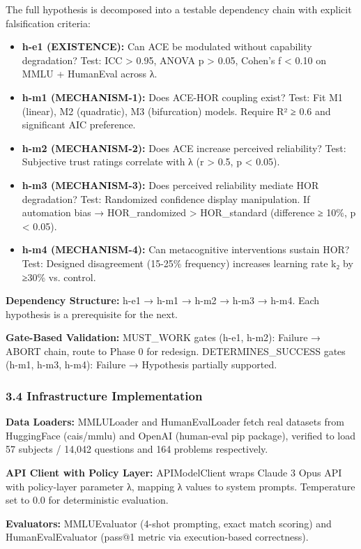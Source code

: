 The full hypothesis is decomposed into a testable dependency chain with explicit falsification criteria:

\begin{itemize}
\item \textbf{h-e1 (EXISTENCE):} Can ACE be modulated without capability degradation? Test: ICC > 0.95, ANOVA p > 0.05, Cohen's f < 0.10 on MMLU + HumanEval across λ.
\item \textbf{h-m1 (MECHANISM-1):} Does ACE-HOR coupling exist? Test: Fit M1 (linear), M2 (quadratic), M3 (bifurcation) models. Require R² ≥ 0.6 and significant AIC preference.
\item \textbf{h-m2 (MECHANISM-2):} Does ACE increase perceived reliability? Test: Subjective trust ratings correlate with λ (r > 0.5, p < 0.05).
\item \textbf{h-m3 (MECHANISM-3):} Does perceived reliability mediate HOR degradation? Test: Randomized confidence display manipulation. If automation bias → HOR_randomized > HOR_standard (difference ≥ 10\%, p < 0.05).
\item \textbf{h-m4 (MECHANISM-4):} Can metacognitive interventions sustain HOR? Test: Designed disagreement (15-25\% frequency) increases learning rate k₂ by ≥30\% vs. control.
\end{itemize}

\textbf{Dependency Structure:} h-e1 → h-m1 → h-m2 → h-m3 → h-m4. Each hypothesis is a prerequisite for the next.

\textbf{Gate-Based Validation:} MUST_WORK gates (h-e1, h-m2): Failure → ABORT chain, route to Phase 0 for redesign. DETERMINES_SUCCESS gates (h-m1, h-m3, h-m4): Failure → Hypothesis partially supported.

\subsubsection{3.4 Infrastructure Implementation}

\textbf{Data Loaders:} MMLULoader and HumanEvalLoader fetch real datasets from HuggingFace (cais/mmlu) and OpenAI (human-eval pip package), verified to load 57 subjects / 14,042 questions and 164 problems respectively.

\textbf{API Client with Policy Layer:} APIModelClient wraps Claude 3 Opus API with policy-layer parameter λ, mapping λ values to system prompts. Temperature set to 0.0 for deterministic evaluation.

\textbf{Evaluators:} MMLUEvaluator (4-shot prompting, exact match scoring) and HumanEvalEvaluator (pass@1 metric via execution-based correctness).

